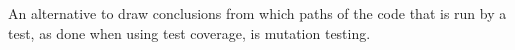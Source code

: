 An alternative to draw conclusions from which paths of the code that is
run by a test, as done when using test coverage, is mutation testing.
